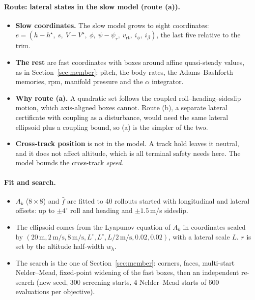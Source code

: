 \documentclass[11pt]{article}
\begin{document}
\paragraph{Route: lateral states in the slow model (route (a)).}
\begin{itemize}
\item \textbf{Slow coordinates.} The slow model grows to eight coordinates: $e = (h - h^\star,\ s,\ V - V^\star,\ \phi,\ \psi - \psi_r,\ v_{\mathrm{rt}},\ i_\phi,\ i_\beta)$, the last five relative to the trim.
\item \textbf{The rest} are fast coordinates with boxes around affine quasi-steady values, as in Section~\ref{sec:member}: pitch, the body rates, the Adams--Bashforth memories, rpm, manifold pressure and the $\alpha$ integrator.
\item \textbf{Why route (a).} A quadratic set follows the coupled roll--heading--sideslip motion, which axis-aligned boxes cannot. Route (b), a separate lateral certificate with coupling as a disturbance, would need the same lateral ellipsoid plus a coupling bound, so (a) is the simpler of the two.
\item \textbf{Cross-track position} is not in the model. A track hold leaves it neutral, and it does not affect altitude, which is all terminal safety needs here. The model bounds the cross-track \emph{speed}.
\end{itemize}

\paragraph{Fit and search.}
\begin{itemize}
\item $A_k$ ($8 \times 8$) and $\bar f$ are fitted to 40 rollouts started with longitudinal and lateral offsets: up to $\pm4^\circ$ roll and heading and $\pm1.5$\,m/s sideslip.
\item The ellipsoid comes from the Lyapunov equation of $A_k$ in coordinates scaled by $(20\,\mathrm{m}, 2\,\mathrm{m/s}, 8\,\mathrm{m/s}, L^\circ, L^\circ, L/2\,\mathrm{m/s}, 0.02, 0.02)$, with a lateral scale $L$. $r$ is set by the altitude half-width $w_h$.
\item The search is the one of Section~\ref{sec:member}: corners, faces, multi-start Nelder--Mead, fixed-point widening of the fast boxes, then an independent re-search (new seed, 300 screening starts, 4 Nelder--Mead starts of 600 evaluations per objective).
\end{itemize}
\end{document}
